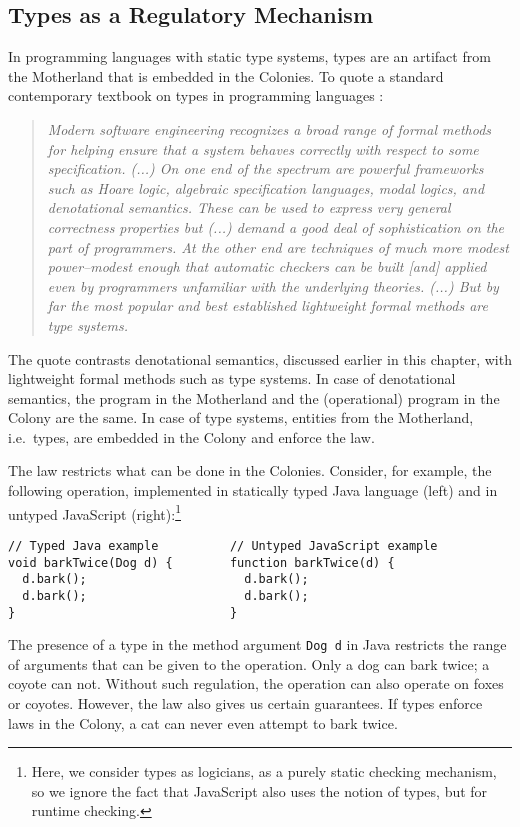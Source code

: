 \documentclass[]{article}
\begin{document}
\subsection{Types as a Regulatory Mechanism}
In programming languages with static type systems, types are an artifact from the Motherland that is embedded in the Colonies. To quote a standard contemporary textbook on types in programming languages \cite{pierce2002types}:

\begin{quotation}
\emph{Modern software engineering recognizes a broad range of formal methods for helping ensure that a system behaves correctly with respect to some specification. (...) On one end of the spectrum are powerful frameworks such as Hoare logic, algebraic specification languages, modal logics, and denotational semantics. These can be used to express very general correctness properties but (...) demand a good deal of sophistication on the part of programmers. At the other end are techniques of much more modest power--modest enough that automatic checkers can be built [and] applied even by programmers unfamiliar with the underlying theories. (...) But by far the most popular and best established lightweight formal methods are type systems.}
\end{quotation}

The quote contrasts denotational semantics, discussed earlier in this chapter, with lightweight  formal methods such as type systems. In case of denotational semantics, the program in the Motherland and the (operational) program in the Colony are the same. In case of type systems, entities from the Motherland, i.e.~types, are embedded in the Colony and enforce the law.

The law restricts what can be done in the Colonies. Consider, for example, the following operation, implemented in statically typed Java language (left) and in untyped JavaScript (right):\footnote{Here, we consider types as logicians, as a purely static checking mechanism, so we ignore the fact that JavaScript also uses the notion of types, but for runtime checking.}

\begin{verbatim}
// Typed Java example          // Untyped JavaScript example
void barkTwice(Dog d) {        function barkTwice(d) {
  d.bark();                      d.bark();
  d.bark();                      d.bark();
}                              }
\end{verbatim}

The presence of a type in the method argument \texttt{Dog d} in Java restricts the range of  arguments that can be given to the operation. Only a dog can bark twice; a coyote can not. Without such regulation, the operation can also operate on foxes or coyotes. However, the law also gives us certain guarantees. If types enforce laws in the Colony, a cat can never even attempt to bark twice.
\end{document}
